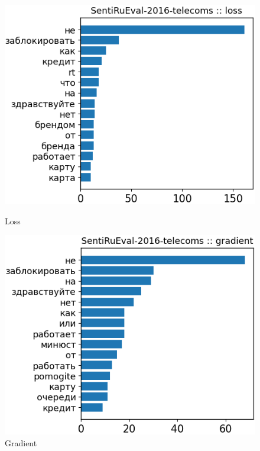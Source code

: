 \begin{itemize}
\begin{figure}[H]
\centering
\begin{minipage}[b]{0.49\textwidth}
\centering
\includegraphics[width=\textwidth]{pictures/examples_telecoms/dct5.png} %
\caption{Loss}
\end{minipage}
\hfill
\begin{minipage}[b]{0.49\textwidth}
\centering
\includegraphics[width=\textwidth]{pictures/examples_telecoms/dct6.png} %
\caption{Gradient}
\end{minipage}
\end{figure}

\end{itemize}

